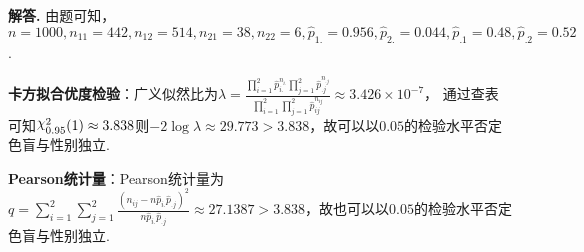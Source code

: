 \documentclass[12pt, a4paper, oneside]{ctexart}
\newenvironment{solution}[1][]{\par\noindent\textbf{#1解答. }}{\smallskip\par}  %
\DeclareRobustCommand{\rchi}{{\mathpalette\irchi\relax}}
\newcommand{\irchi}[2]{\raisebox{\depth}{$#1\chi$}} %
\def\add{\vspace{1ex}}      %
\begin{document}
\begin{solution}
    由题可知，$n=1000, n_{11} = 442, n_{12} = 514, n_{21} = 38, n_{22} = 6, \hat{p}_{1.} = 0.956, \hat{p}_{2.} = 0.044, \hat{p}_{.1}=0.48, \hat{p}_{.2}=0.52$.\add

    \textbf{卡方拟合优度检验}：广义似然比为$\lambda = \frac{\prod_{i=1}^2\hat{p}_{i.}^{n_{i.}}\prod_{j=1}^2\hat{p}_{.j}^{n_{.j}}}{\prod_{i=1}^2\prod_{j=1}^2\hat{p}_{ij}^{n_{ij}}}\approx 3.426\times 10^{-7}$，
    通过查表可知$\rchi^2_{0.95}(1)\approx 3.838$则$-2\log \lambda \approx 29.773 > 3.838$，故可以以$0.05$的检验水平否定色盲与性别独立.

    \textbf{Pearson统计量}：Pearson统计量为$q = \sum_{i=1}^2\sum_{j=1}^2\frac{(n_{ij}-n\hat{p}_{i.}\hat{p}_{.j})^2}{n\hat{p}_{i.}\hat{p}_{.j}}\approx 27.1387 > 3.838$，故也可以以$0.05$的检验水平否定色盲与性别独立.
\end{solution}
\end{document}
